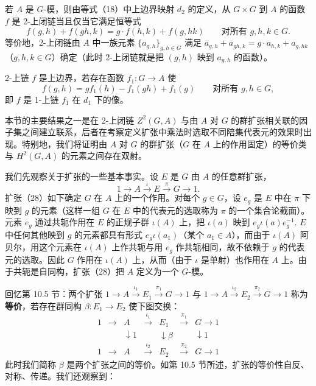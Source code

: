 若 \(A\) 是 \(G\)-模，则由等式（18）中上边界映射 \(d_2\) 的定义，从 \(G \times G\) 到 \(A\) 的函数 \(f\) 是 2-上闭链当且仅当它满足恒等式
\[
f(g, h)+f(gh, k) = g \cdot f(h, k)+f(g, hk) \qquad \text{对所有 } g, h, k \in G. \tag{17.26}
\]
等价地，2-上闭链由 \(A\) 中一族元素 \(\{a_{g,h}\}_{g,h \in G}\) 满足 \(a_{g,h}+a_{gh,k} = g \cdot a_{h,k}+a_{g,hk}\)（\(g, h, k \in G\)）确定（此时 2-上闭链就是把 \((g,h)\) 映到 \(a_{g,h}\) 的函数）。

2-上链 \(f\) 是上边界，若存在函数 \(f_1 : G \to A\) 使
\[
f(g, h) = g f_1(h)-f_1(gh)+f_1(g) \qquad \text{对所有 } g, h \in G, \tag{17.27}
\]
即 \(f\) 是 1-上链 \(f_1\) 在 \(d_1\) 下的像。

本节的主要结果之一是在 2-上闭链 \(Z^2(G, A)\) 与由 \(A\) 对 \(G\) 的群扩张相关联的因子集之间建立联系，后者在考察定义扩张中乘法时选取不同陪集代表元的效果时出现。特别地，我们将证明由 \(A\) 对 \(G\) 的群扩张（\(G\) 在 \(A\) 上的作用固定）的等价类与 \(H^2(G, A)\) 的元素之间存在双射。

我们先观察关于扩张的一些基本事实。设 \(E\) 是 \(G\) 由 \(A\) 的任意群扩张，
\[
1 \to A \xrightarrow{\iota} E \xrightarrow{\pi} G \to 1. \tag{17.28}
\]
扩张（28）如下确定 \(G\) 在 \(A\) 上的一个作用。对每个 \(g \in G\)，设 \(e_g\) 是 \(E\) 中在 \(\pi\) 下映到 \(g\) 的元素（这样一组 \(G\) 在 \(E\) 中的代表元的选取称为 \(\pi\) 的一个集合论截面）。元素 \(e_g\) 通过共轭作用在 \(E\) 的正规子群 \(\iota(A)\) 上，把 \(\iota(a)\) 映到 \(e_g\iota(a)e_g^{-1}\). \(E\) 中任何其他映到 \(g\) 的元素都具有形式 \(e_g\iota(a_1)\)（某个 \(a_1 \in A\)），而由于 \(\iota(A)\) 阿贝尔，用这个元素在 \(\iota(A)\) 上作共轭与用 \(e_g\) 作共轭相同，故不依赖于 \(g\) 的代表元的选取。因此 \(G\) 作用在 \(\iota(A)\) 上，从而（由于 \(\iota\) 是单射）也作用在 \(A\) 上。由于共轭是自同构，扩张（28）把 \(A\) 定义为一个 \(G\)-模。

回忆第 10.5 节：两个扩张 \(1 \to A \xrightarrow{\iota_1} E_1 \xrightarrow{\pi_1} G \to 1\) 与 \(1 \to A \xrightarrow{\iota_2} E_2 \xrightarrow{\pi_2} G \to 1\) 称为\textbf{等价}，若存在群同构 \(\beta : E_1 \to E_2\) 使下图交换：
\[
\begin{array}{ccccccc}
1 & \to & A & \xrightarrow{\iota_1} & E_1 & \xrightarrow{\pi_1} & G \to 1\\
& & \downarrow 1 & & \downarrow\beta & & \downarrow 1\\
1 & \to & A & \xrightarrow{\iota_2} & E_2 & \xrightarrow{\pi_2} & G \to 1
\end{array} \tag{17.29}
\]
此时我们简称 \(\beta\) 是两个扩张之间的等价。如第 10.5 节所述，扩张的等价性自反、对称、传递。我们还观察到：

